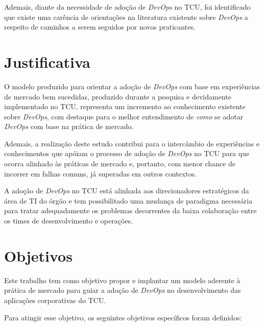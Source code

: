 Ademais, diante da necessidade de adoção de \textit{DevOps} no TCU, foi
identificado que existe uma carência de orientações na literatura existente
sobre \textit{DevOps} a respeito de caminhos a serem seguidos por novos
praticantes.

\section{Justificativa}%

O modelo produzido para orientar a adoção de \textit{DevOps} com base em
experiências de mercado bem sucedidas, produzido durante a pesquisa e
devidamente implementado no \acrshort{TCU}, representa um
incremento ao conhecimento existente sobre \textit{DevOps}, com destaque
para o melhor entendimento de \emph{como} se adotar \textit{DevOps} com base na
prática de mercado.

Ademais, a realização deste estudo contribui para o intercâmbio de experiências
e conhecimentos que apóiam o processo de adoção de \textit{DevOps} no TCU
para que ocorra alinhado às práticas de mercado e, portanto, com menor
chance de incorrer em falhas comuns, já superadas em outros contextos.

A adoção de \textit{DevOps} no \acrshort{TCU} está alinhada aos direcionadores
estratégicos da área de \acrshort{TI} do órgão e tem possibilitado uma
mudança de paradigma necessária para tratar adequadamente os problemas
decorrentes da baixa colaboração entre os times de desenvolvimento e operações.

\section{Objetivos}
Este trabalho tem como objetivo propor e implantar um modelo aderente à prática
de mercado para guiar a adoção de \textit{DevOps} no desenvolvimento das
aplicações corporativas do \acrshort{TCU}.

Para atingir esse objetivo, os seguintes objetivos específicos foram definidos:

